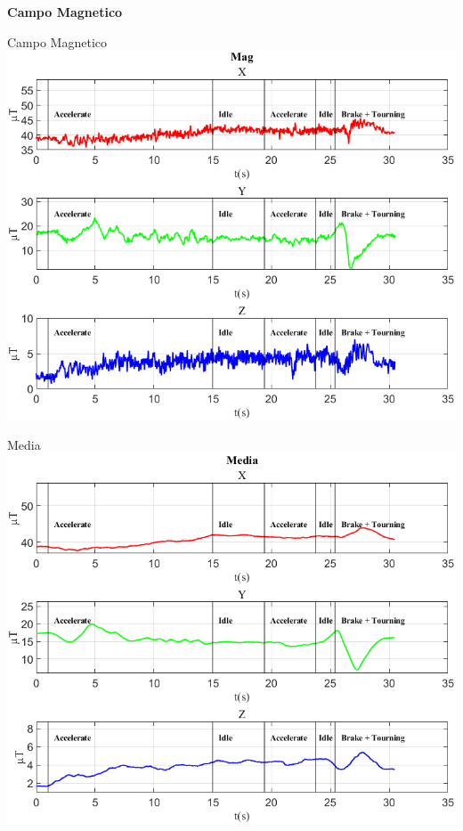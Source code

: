 \documentclass[beamer]{standalone}
\begin{document}
	\begin{frame}
		\color{blue}\centering\Huge{\textbf{Campo Magnetico}}	
	\end{frame}
	
	\begin{frame}{{Campo Magnetico}}
		\centering\includegraphics[height=.8\textheight]{figure/Mag/Mag}
	\end{frame}
	
	\begin{frame}{{Media}}
		\centering\includegraphics[height=.8\textheight]{figure/Mag/Media}
	\end{frame}
	
\end{document}
